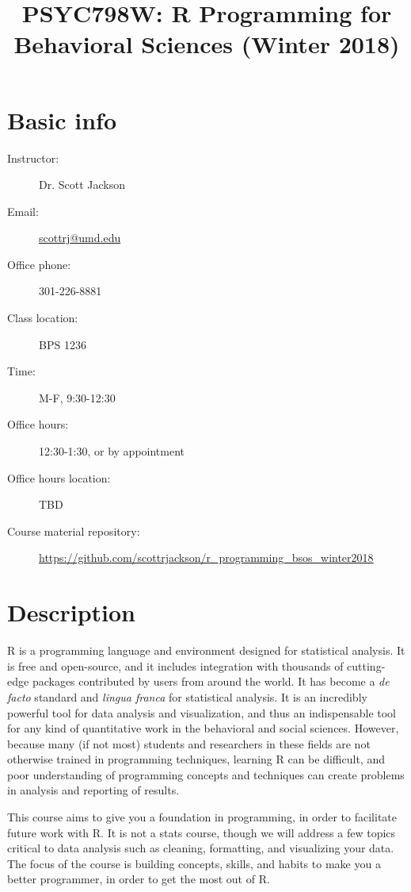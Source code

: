 \documentclass[11pt]{tufte-handout}
\date{}
\title{PSYC798W: R Programming for Behavioral Sciences (Winter 2018)}
\begin{document}
\maketitle
\section*{Basic info}
\label{sec-1}
\begin{description}
\item[{Instructor:}] Dr. Scott Jackson
\item[{Email:}] \href{mailto:scottrj@umd.edu}{scottrj@umd.edu}
\item[{Office phone:}] 301-226-8881
\item[{Class location:}] BPS 1236
\item[{Time:}] M-F, 9:30-12:30
\item[{Office hours:}] 12:30-1:30, or by appointment
\item[{Office hours location:}] TBD
\item[{Course material repository:}] \url{https://github.com/scottrjackson/r_programming_bsos_winter2018}
\end{description}

\section*{Description}
\label{sec-2}
R  is a programming language and environment designed for statistical analysis. It is free and open-source, and it includes integration with thousands of cutting-edge packages contributed by users from around the world. It has become a \emph{de facto} standard and \emph{lingua franca} for statistical analysis.  It is an incredibly powerful tool for data analysis and visualization, and thus an indispensable tool for any kind of quantitative work in the behavioral and social sciences. However, because many (if not most) students and researchers in these fields are not otherwise trained in programming techniques, learning R can be difficult, and poor understanding of programming concepts and techniques can create problems in analysis and reporting of results. 

This course aims to give you a foundation in programming, in order to facilitate future work with R.  It is not a stats course, though we will address a few topics critical to data analysis such as cleaning, formatting, and visualizing your data.  The focus of the course is building concepts, skills, and habits to make you a better programmer, in order to get the most out of R.
\end{document}
